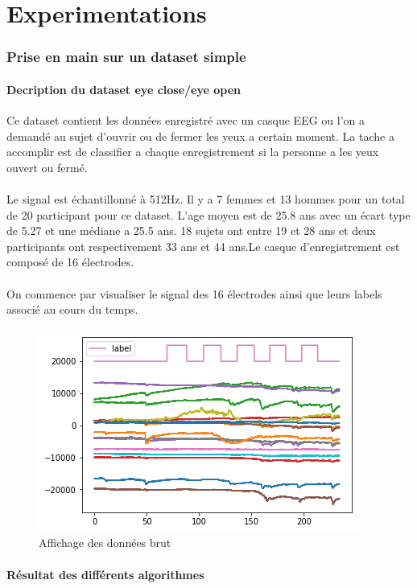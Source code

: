 \documentclass{article}
\begin{document}
\part{Experimentations}
\section{Prise en main sur un dataset simple}
\subsection{Decription du dataset eye close/eye open}
Ce dataset contient les données enregistré avec un casque EEG ou l'on a demandé au sujet d'ouvrir ou de fermer les yeux a certain moment. La tache a accomplir est de classifier a chaque enregistrement si la personne a les yeux ouvert ou fermé.\\
\\
Le signal est échantillonné à 512Hz. Il y a 7 femmes et 13 hommes pour un total de 20 participant pour ce dataset. L'age moyen est de 25.8 ans avec un écart type de 5.27 et une médiane a 25.5 ans. 18 sujets ont entre 19 et 28 ans et deux participants ont respectivement 33 ans et 44 ans.Le casque d'enregistrement est composé de 16 électrodes.\\
\\
On commence par visualiser le signal des 16 électrodes ainsi que leurs labels associé au cours du temps.\\
\begin{figure}[H]
\begin{center}
\includegraphics[scale=0.8]{images/donnees_entree.png}
\end{center}
\caption{Affichage des données brut}
\end{figure}

\subsection{Résultat des différents algorithmes}
\end{document}
